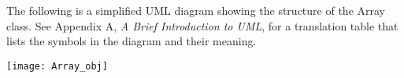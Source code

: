 
\pagebreak


The following is a simplified UML diagram showing the structure of the
Array class.  See Appendix A, {\it A Brief Introduction to UML},
for a translation table that lists the symbols in the diagram and their 
meaning.

\begin{center}
\texttt{[image: Array\_obj]}   
\end{center}
